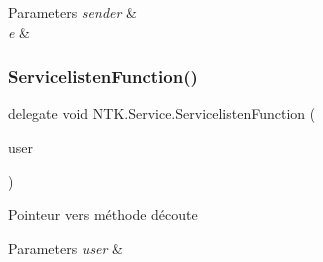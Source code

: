 \begin{DoxyParams}{Parameters}
{\em sender} & \\
\hline
{\em e} & \\
\hline
\end{DoxyParams}
\mbox{\label{namespace_n_t_k_1_1_service_a49f4581ae6fb3e9c155d034c47791db9}} 
\subsubsection{\texorpdfstring{ServicelistenFunction()}{ServicelistenFunction()}}
{\footnotesize\ttfamily delegate void N\+T\+K.\+Service.\+Servicelisten\+Function (\begin{DoxyParamCaption}\item[{\mbox{\hyperlink{class_n_t_k_1_1_n_t_k_user}{N\+T\+K\+User}}}]{user }\end{DoxyParamCaption})}



Pointeur vers méthode d\textquotesingle{}écoute 


\begin{DoxyParams}{Parameters}
{\em user} & \\
\hline
\end{DoxyParams}
